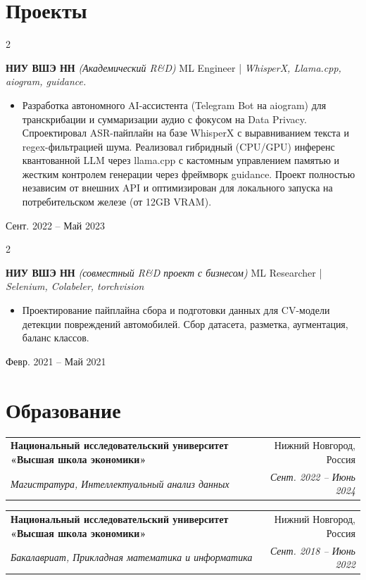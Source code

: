 \documentclass[12pt, a4paper]{article}
\makeatletter
\newenvironment{highlights}{
  \begin{itemize}[
    topsep=0.05 cm,
    parsep=0.10 cm,
    partopsep=0pt,
    itemsep=0pt,
    leftmargin=0.4 cm + 10pt
  ]
}{
  \end{itemize}
}
\newenvironment{twocolentry}[2][]{
  \onecolentry
  \def\secondColumn{#2}
  \setcolumnwidth{\fill, 3.5 cm}
  \begin{paracol}{2}
}{
  \switchcolumn \raggedleft \secondColumn
  \end{paracol}
  \endonecolentry
}
\newcommand{\eduentry}[4]{%
  \noindent
  \begin{tabular*}{\linewidth}{@{}l@{\extracolsep{\fill}}r@{}}
    \textbf{#1} & #2\\[-0.2em]
    \textit{#3} & \textit{#4}\\
  \end{tabular*}\par
}
\let\hrefWithoutArrow\href
\renewcommand{\href}[2]{\hrefWithoutArrow{#1}{\ifthenelse{\equal{#2}{}}{ }{#2 }\raisebox{.15ex}{\footnotesize \faExternalLink*}}}
\makeatother
\begin{document}
\section{Проекты}
\begin{twocolentry}{Сент. 2022 -- Май 2023}
  \textbf{НИУ ВШЭ НН} \textit{(Академический R\&D)}\newline
  ML Engineer | \textit{WhisperX, Llama.cpp, aiogram, guidance. \href{https://github.com/J1nsei/Voice-Message-Summarization-Bot}{GitHub}}
  \begin{highlights}
    \item Разработка автономного AI-ассистента (Telegram Bot на aiogram) для транскрибации и суммаризации аудио с фокусом на Data Privacy. Спроектировал ASR-пайплайн на базе WhisperX с выравниванием текста и regex-фильтрацией шума. Реализовал гибридный (CPU/GPU) инференс квантованной LLM через llama.cpp с кастомным управлением памятью и жестким контролем генерации через фреймворк guidance. Проект полностью независим от внешних API и оптимизирован для локального запуска на потребительском железе (от 12GB VRAM).
  \end{highlights}
\end{twocolentry}

\begin{twocolentry}{Февр. 2021 -- Май 2021}
  \textbf{НИУ ВШЭ НН} \textit{(совместный R\&D проект с бизнесом)}\newline
  ML Researcher | \textit{Selenium, Colabeler, torchvision}
  \begin{highlights}
    \item Проектирование пайплайна сбора и подготовки данных для CV-модели детекции повреждений автомобилей. Сбор датасета, разметка, аугментация, баланс классов.
  \end{highlights}
\end{twocolentry}

\section{Образование}

\eduentry
{Национальный исследовательский университет «Высшая школа экономики»}
{Нижний Новгород, Россия}
{Магистратура, Интеллектуальный анализ данных}
{Сент. 2022 -- Июнь 2024}

\eduentry
{Национальный исследовательский университет «Высшая школа экономики»}
{Нижний Новгород, Россия}
{Бакалавриат, Прикладная математика и информатика}
{Сент. 2018 -- Июнь 2022}
\end{document}
